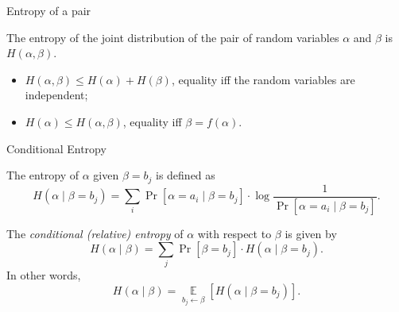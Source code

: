 \documentclass[handout,aspectratio=169]{beamer}
\DeclareMathOperator*{\E}{\mathbb{E}}
\begin{document}
\begin{frame}{Entropy of a pair}
\begin{definition}
    The entropy of the joint distribution of the pair of random variables \(\alpha\) and \(\beta\) is \(H(\alpha, \beta)\).
\end{definition}

\begin{lemma}
    \begin{itemize}
        \item \(H(\alpha, \beta) \le H(\alpha) + H(\beta)\), equality iff the random variables are independent;
        \item \(H(\alpha) \le H(\alpha, \beta)\), equality iff \(\beta = f(\alpha)\).
    \end{itemize}
\end{lemma}
\end{frame}


\begin{frame}{Conditional Entropy}
\begin{definition}\label{def:cond-entropy1}
    The entropy of \(\alpha\) given \(\beta = b_j\) is defined as
    \[
    H(\alpha\mid\beta = b_j) = \sum_i \Pr[\alpha = a_i\mid \beta = b_j] \cdot
    \log\frac{1}{\Pr[\alpha = a_i\mid \beta = b_j]}.
    \]
\end{definition}
\vspace{-5mm}

\begin{definition}\label{def:cond-entropy2}
    The \emph{conditional (relative) entropy} of \(\alpha\) with respect to \(\beta\) is given by
    \[
    H(\alpha\mid\beta) = \sum_j \Pr[\beta = b_j] \cdot H(\alpha\mid \beta = b_j).
    \]
    In other words,
    \[
    H(\alpha\mid\beta) = \E\limits_{b_j \gets \beta}[H(\alpha\mid \beta = b_j)].
    \]
\end{definition}
\end{frame}
\end{document}

